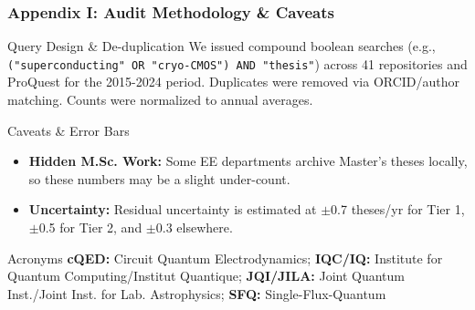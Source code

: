 \documentclass[aspectratio=169]{beamer}
\begin{document}
\begin{frame}[fragile]
    \frametitle{Appendix I: Audit Methodology \& Caveats}
    \begin{block}{Query Design \& De-duplication}
        We issued compound boolean searches (e.g., \texttt{\tiny("superconducting" OR "cryo-CMOS") AND "thesis"}) across 41 repositories and ProQuest for the 2015-2024 period. Duplicates were removed via ORCID/author matching. Counts were normalized to annual averages.
    \end{block}
    
    \begin{block}{Caveats \& Error Bars}
        \begin{itemize}
            \item \textbf{Hidden M.Sc. Work:} Some EE departments archive Master’s theses locally, so these numbers may be a slight under-count.
            \item \textbf{Uncertainty:} Residual uncertainty is estimated at $\pm$0.7 theses/yr for Tier 1, $\pm$0.5 for Tier 2, and $\pm$0.3 elsewhere.
        \end{itemize}
    \end{block}

    \begin{block}{Acronyms}
        \tiny \textbf{cQED:} Circuit Quantum Electrodynamics; \textbf{IQC/IQ:} Institute for Quantum Computing/Institut Quantique; \textbf{JQI/JILA:} Joint Quantum Inst./Joint Inst. for Lab. Astrophysics; \textbf{SFQ:} Single-Flux-Quantum
    \end{block}
\end{frame}
\end{document}
